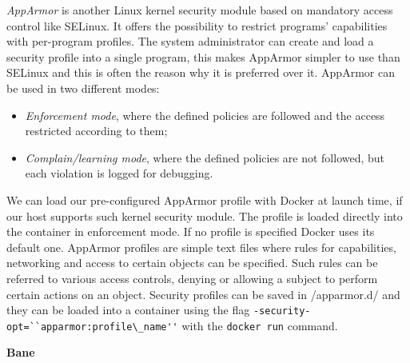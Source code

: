 \documentclass[a4paper,12pt]{article}
\newcommand{\code}[1]{\lstinline|#1|}
\begin{document}
\textit{AppArmor} is another Linux kernel security module based on mandatory
access control like SELinux. It offers the possibility to restrict programs'
capabilities with per-program profiles. The system administrator can create and
load a security profile into a single program, this makes AppArmor simpler to
use than SELinux and this is often the reason why it is preferred over it.
AppArmor can be used in two different modes:
\begin{itemize}
  \item \textit{Enforcement mode}, where the defined policies are followed and
  the access restricted according to them; 
  \item \textit{Complain/learning mode}, where the defined policies are not
  followed, but each violation is logged for debugging.
\end{itemize}
We can load our pre-configured AppArmor profile with Docker at launch time, if
our host supports such kernel security module. The profile is loaded directly
into the container in enforcement mode. If no profile is specified Docker uses
its default one. AppArmor profiles are simple text files where rules
for capabilities, networking and access to certain objects can be specified.
Such rules can be referred to various access controls, denying or allowing a
subject to perform certain actions on an object.   Security profiles can be
saved in /apparmor.d/ and they can be loaded into a container using the flag
\code{-security-opt=``apparmor:profile\_name''} with the \code{docker run}
command. 

\bigbreak\textbf{Bane}\bigbreak 
\end{document}
